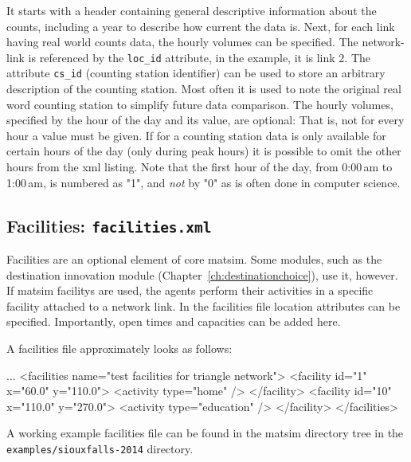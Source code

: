 It starts with a header containing general descriptive information about the counts, including a year to describe how current the data is. Next, for each link having real world counts data, the hourly volumes can be specified. The network-link is referenced by the \lstinline|loc_id| attribute, in the example, it is link 2. The attribute \lstinline|cs_id| (counting station identifier) can be used to store an arbitrary description of the counting station. Most often it is used to note the original real word counting station to simplify future data comparison. The hourly volumes, specified by the hour of the day and its value, are optional: That is, not for every hour a value must be given. If for a counting station data is only available for certain hours of the day (\eg only during peak hours) it is possible to omit the other hours from the \gls{xml} listing.  Note that the first hour of the day, from 0:00\,am to 1:00\,am, is numbered as "1", and \emph{not} by "0" as is often done in computer science.

\subsection{Facilities: \lstinline|facilities.xml|}
\label{sec:facilitiescontainer}
Facilities are an optional element of core \gls{matsim}. 
Some \glspl{module}, such as the destination innovation module (Chapter~\ref{ch:destinationchoice}), use it, however.
If \gls{matsim} \glspl{facility} are used, the agents perform their activities in a specific \gls{facility} attached to a network link. 
In the facilities file location attributes can be specified. Importantly, open times and capacities can be added here. 

A facilities file approximately looks as follows:
\begin{xml}
...
<facilities name="test facilities for triangle network">
	<facility id="1" x="60.0" y="110.0">
		<activity type="home" />
	</facility>
	<facility id="10" x="110.0" y="270.0">
		<activity type="education" />
	</facility>
</facilities>
\end{xml}
A working example facilities file can be found in the \gls{matsim} directory tree in the \lstinline{examples/siouxfalls-2014} directory.

